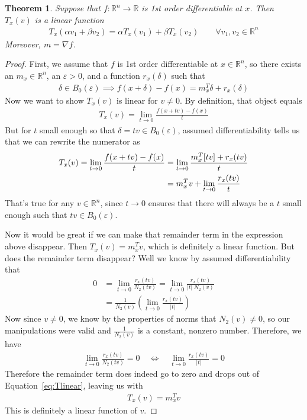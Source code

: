 \documentclass[12pt]{article}
\numberwithin{equation}{section} %
\theoremstyle{plain}
\newtheorem{thm}{Theorem}[section]
\theoremstyle{definition}
\theoremstyle{remark}
\newcommand{\R}{\mathbb{R}}
\newcommand{\Rn}{\mathbb{R}^n}
\begin{document}
\begin{thm}
Suppose that $f:\Rn\rightarrow\R$ is 1st order differentiable at $x$.
Then $T_x(v)$ is a linear function
\begin{align*}
  T_x(\alpha v_1 + \beta v_2)
  = \alpha T_x(v_1) + \beta T_x(v_2)
  \qquad \forall v_1,v_2\in\Rn
\end{align*}
Moreover, $m=\nabla f$.
\end{thm}
\begin{proof}
First, we assume that $f$ is 1st order differentiable at $x\in\Rn$, so
there exists an $m_x\in\Rn$, an $\varepsilon>0$, and a function
$r_x(\delta)$ such that
\begin{align*}
  \delta\in B_0(\varepsilon)
  \implies
  f(x+\delta) - f(x) = m_x^T \delta + r_x(\delta)
\end{align*}
Now we want to show $T_x(v)$ is linear for $v\neq 0$. By definition,
that object equals
\begin{align*}
  T_x(v) = \lim_{t\rightarrow 0} \frac{f(x+tv) - f(x)}{t}
\end{align*}
But for $t$ small enough so that $\delta=tv\in B_0(\varepsilon)$,
assumed differentiability tells us that we can rewrite the numerator as
\begin{align}
  T_x(v)
  = \lim_{t\rightarrow 0} \frac{f(x+tv) - f(x)}{t}
  &= \lim_{t\rightarrow 0} \frac{m_x^T [tv] + r_x(tv)}{t}\notag\\
  &= m_x^T v + \lim_{t\rightarrow 0} \frac{r_x(tv)}{t}
  \label{eq:Tlinear}
\end{align}
That's true for any $v\in\Rn$, since $t\rightarrow 0$ ensures that there
will always be a $t$ small enough such that $tv\in B_0(\varepsilon)$.

Now it would be great if we can make that remainder term in the
expression above disappear. Then $T_x(v)=m_x^Tv$, which is definitely a
linear function. But does the remainder term disappear?
Well we know by assumed differentiability that
\begin{align*}
  0
  &= \lim_{t\rightarrow 0} \frac{r_x(tv)}{N_2(tv)}
  = \lim_{t\rightarrow 0} \frac{r_x(tv)}{|t| \; N_2(v)}\\
  &= \frac{1}{N_2(v)}
  \left(\lim_{t\rightarrow 0} \frac{r_x(tv)}{|t|}\right)
\end{align*}
Now since $v\neq 0$, we know by the properties of norms that $N_2(v)\neq
0$, so our manipulations were valid and $\frac{1}{N_2(v)}$ is a
constant, nonzero number. Therefore, we have
\begin{align*}
  \lim_{t\rightarrow 0} \frac{r_x(tv)}{N_2(tv)} = 0
  \quad\iff\quad
  \lim_{t\rightarrow 0} \frac{r_x(tv)}{|t|} = 0
\end{align*}
Therefore the remainder term does indeed go to zero and drops out of
Equation~\ref{eq:Tlinear}, leaving us with
\begin{align*}
  T_x(v) = m_x^T v
\end{align*}
This is definitely a linear function of $v$.


\end{proof}
\end{document}
